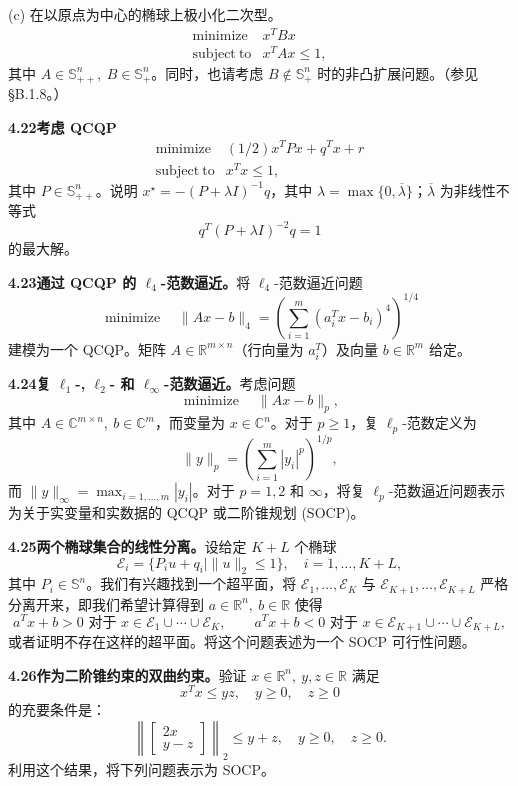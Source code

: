 \documentclass[UTF8,12pt,a4paper,fontset=fandol]{ctexart}
\begin{document}
(c) 在以原点为中心的椭球上极小化二次型。
\[
\begin{array}{ll}
\mathop{\mathrm{minimize}} & x^TBx\\
\mathrm{subject\ to} & x^TAx\leq1,
\end{array}
\]
其中 $A\in\mathbb{S}_{++}^n,\ B\in\mathbb{S}_+^n$。同时，也请考虑 $B\notin\mathbb{S}_+^n$ 时的非凸扩展问题。（参见 \S B.1.8。）

\noindent\textbf{4.22\quad 考虑 QCQP}
\[
\begin{array}{ll}
\mathop{\mathrm{minimize}} & (1/2)x^TPx+q^Tx+r\\
\mathrm{subject\ to} & x^Tx\leq1,
\end{array}
\]
其中 $P\in\mathbb{S}_{++}^n$。说明 $x^\star=-(P+\lambda I)^{-1}q$，其中 $\lambda=\max\{0,\overline{\lambda}\}$；$\overline{\lambda}$ 为非线性不等式
\[
q^T(P+\lambda I)^{-2}q=1
\]
的最大解。

\noindent\textbf{4.23\quad 通过 QCQP 的 $\ell_4$-范数逼近。}\quad 将 $\ell_4$-范数逼近问题
\[
\mathop{\mathrm{minimize}}\quad \|Ax-b\|_4=\left(\sum_{i=1}^m(a_i^Tx-b_i)^4\right)^{1/4}
\]
建模为一个 QCQP。矩阵 $A\in\mathbb{R}^{m\times n}$（行向量为 $a_i^T$）及向量 $b\in\mathbb{R}^m$ 给定。

\noindent\textbf{4.24\quad 复 $\ell_1$-, $\ell_2$- 和 $\ell_\infty$-范数逼近。}\quad 考虑问题
\[
\mathop{\mathrm{minimize}}\quad \|Ax-b\|_p,
\]
其中 $A\in\mathbb{C}^{m\times n},\ b\in\mathbb{C}^m$，而变量为 $x\in\mathbb{C}^n$。对于 $p\geq1$，复 $\ell_p$-范数定义为
\[
\|y\|_p=\left(\sum_{i=1}^m |y_i|^p\right)^{1/p},
\]
而 $\|y\|_\infty=\max_{i=1,\ldots,m}|y_i|$。对于 $p=1,2$ 和 $\infty$，将复 $\ell_p$-范数逼近问题表示为关于实变量和实数据的 QCQP 或二阶锥规划 (SOCP)。

\noindent\textbf{4.25\quad 两个椭球集合的线性分离。}\quad 设给定 $K+L$ 个椭球
\[
\mathcal{E}_i=\{P_iu+q_i\mid \|u\|_2\leq1\},\quad i=1,\ldots,K+L,
\]
其中 $P_i\in\mathbb{S}^n$。我们有兴趣找到一个超平面，将 $\mathcal{E}_1,\ldots,\mathcal{E}_K$ 与 $\mathcal{E}_{K+1},\ldots,\mathcal{E}_{K+L}$ 严格分离开来，即我们希望计算得到 $a\in\mathbb{R}^n,\ b\in\mathbb{R}$ 使得
\[
a^Tx+b>0\text{ 对于 }x\in\mathcal{E}_1\cup\cdots\cup\mathcal{E}_K,\qquad
a^Tx+b<0\text{ 对于 }x\in\mathcal{E}_{K+1}\cup\cdots\cup\mathcal{E}_{K+L},
\]
或者证明不存在这样的超平面。将这个问题表述为一个 SOCP 可行性问题。

\noindent\textbf{4.26\quad 作为二阶锥约束的双曲约束。}\quad 验证 $x\in\mathbb{R}^n,\ y,z\in\mathbb{R}$ 满足
\[
x^Tx\leq yz,\quad y\geq0,\quad z\geq0
\]
的充要条件是：
\[
\left\|\begin{bmatrix}2x\\ y-z\end{bmatrix}\right\|_2\leq y+z,\quad y\geq0,\quad z\geq0.
\]
利用这个结果，将下列问题表示为 SOCP。
\end{document}
